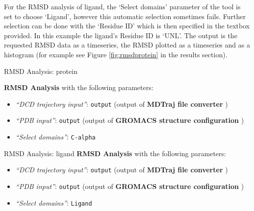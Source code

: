 \documentclass[twocolumn]{bmcart}%
\providecommand{\tightlist}{%
  \setlength{\itemsep}{0pt}\setlength{\parskip}{0pt}}
\begin{document}
For the RMSD analysis of ligand, the `Select domains' parameter of the tool is set to choose `Ligand', however this automatic selection sometimes fails. Further selection can be done with the `Residue ID' which is then specified in the textbox provided. In this example the ligand's Residue ID is `UNL'. The output is the requested RMSD data as a timeseries, the RMSD plotted as a timeseries and as a histogram (for example see Figure \ref{fig:rmsdprotein} in the results section).

\begin{handson_box_colour}{RMSD Analysis: protein}

  \textbf{RMSD Analysis} with the following parameters:

  \begin{itemize}
  \tightlist
    \item
    \emph{``DCD trajectory input''}: \texttt{output} (output of
    \textbf{MDTraj file converter} )
  \item
    \emph{``PDB input''}: \texttt{output} (output of \textbf{GROMACS
    structure configuration} )
  \item
    \emph{``Select domains''}: \texttt{C-alpha}
  \end{itemize}

\end{handson_box_colour}

\begin{handson_box_colour}{RMSD Analysis: ligand}
  \textbf{RMSD Analysis} with the following parameters:

  \begin{itemize}
  \tightlist
  \item
    \emph{``DCD trajectory input''}: \texttt{output} (output of
    \textbf{MDTraj file converter} )
  \item
    \emph{``PDB input''}: \texttt{output} (output of \textbf{GROMACS
    structure configuration} )
  \item
    \emph{``Select domains''}: \texttt{Ligand}
  \end{itemize}

\end{handson_box_colour}
\end{document}
